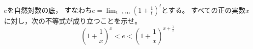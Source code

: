 \documentclass[../../main.tex]{subfiles}
\begin{document}
$e$を自然対数の底，
すなわち$\displaystyle e=\lim_{t\to\infty}{\left( 1+\frac{1}{t} \right)}^t$とする。
すべての正の実数$x$に対し，次の不等式が成り立つことを示せ。
\[ {\left( 1+\frac{1}{x} \right)}^x<e<{\left( 1+\frac{1}{x} \right)}^{x+\frac{1}{2}} \]
\end{document}
